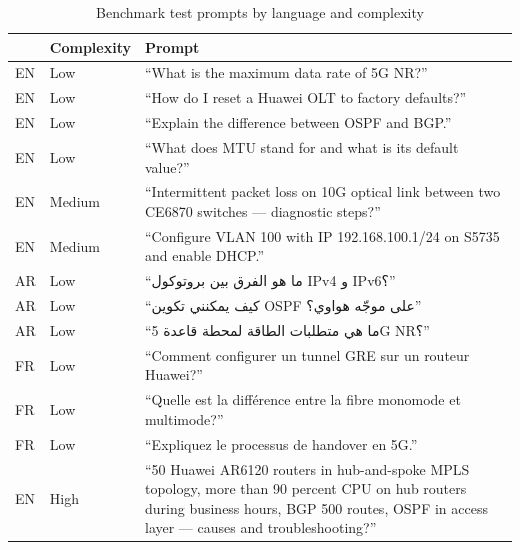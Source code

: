 \begin{table}[htbp]
  \centering
  \caption{Benchmark test prompts by language and complexity}
  \label{tab:benchmark-prompts}
  \begin{tabularx}{\textwidth}{llX}
    \toprule
    \tableheader{Lang & Complexity & Prompt} \\
    \midrule
    EN & Low   & ``What is the maximum data rate of 5G NR?'' \\
    \rowcolor{TableRowOdd}
    EN & Low   & ``How do I reset a Huawei OLT to factory defaults?'' \\
    EN & Low   & ``Explain the difference between OSPF and BGP.'' \\
    \rowcolor{TableRowOdd}
    EN & Low   & ``What does MTU stand for and what is its default value?'' \\
    EN & Medium & ``Intermittent packet loss on 10G optical link between
                   two CE6870 switches — diagnostic steps?'' \\
    \rowcolor{TableRowOdd}
    EN & Medium & ``Configure VLAN 100 with IP 192.168.100.1/24 on S5735
                   and enable DHCP.'' \\
    AR & Low   & \foreignlanguage{arabic}{``ما هو الفرق بين بروتوكول IPv4 و IPv6؟''} \\
    \rowcolor{TableRowOdd}
    AR & Low   & \foreignlanguage{arabic}{``كيف يمكنني تكوين OSPF على موجّه هواوي؟''} \\
    AR & Low   & \foreignlanguage{arabic}{``ما هي متطلبات الطاقة لمحطة قاعدة 5G NR؟''} \\
    \rowcolor{TableRowOdd}
    FR & Low   & ``Comment configurer un tunnel GRE sur un routeur Huawei?'' \\
    FR & Low   & ``Quelle est la différence entre la fibre monomode et multimode?'' \\
    \rowcolor{TableRowOdd}
    FR & Low   & ``Expliquez le processus de handover en 5G.'' \\
    EN & High  & ``50 Huawei AR6120 routers in hub-and-spoke MPLS topology,
                   more than 90 percent CPU on hub routers during business hours, 
                   BGP 500 routes, OSPF in access layer — causes and troubleshooting?'' \\
    \bottomrule
  \end{tabularx}
\end{table}

